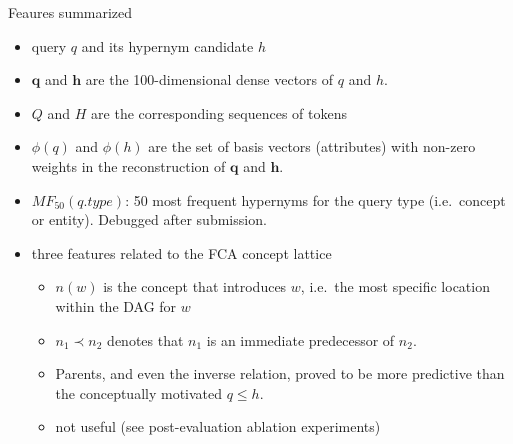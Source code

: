 \documentclass{beamer}
\newlength{\onecolwid}
\begin{document}
\begin{frame}[t]
\begin{columns}[t]
\begin{column}{\onecolwid}
\begin{block}{Feaures summarized}

\begin{itemize}
  \item query $q$ and its hypernym candidate $h$
  \item $\mathbf{q}$ and $\mathbf{h}$ are the 100-dimensional dense vectors of
    $q$ and $h$.
  \item $Q$ and $H$ are the corresponding sequences of tokens 
  \item $\phi(q)$ and $\phi(h)$ are the set of basis vectors (attributes) with
    non-zero weights in the reconstruction of $\mathbf q$ and $\mathbf h$.
  \item $MF_{50}(q.type)$: 50 most frequent hypernyms for the query type
    (i.e.~concept or entity). Debugged after submission.
  \item three features related to the \alert{FCA concept lattice}
    \begin{itemize}
      \item $n(w)$ is the concept that introduces $w$, i.e.~the most specific
        location within the DAG for $w$

      \item $n_1\prec n_2$ denotes that $n_1$ is an immediate predecessor of $n_2$.
      \item Parents, and even the inverse relation, proved to be more predictive
        than the conceptually motivated  $q\le h$.
      \item not useful (see post-evaluation ablation experiments)
    \end{itemize}



\end{itemize}
\end{block}
\end{column}
\end{columns}
\end{frame}
\end{document}
